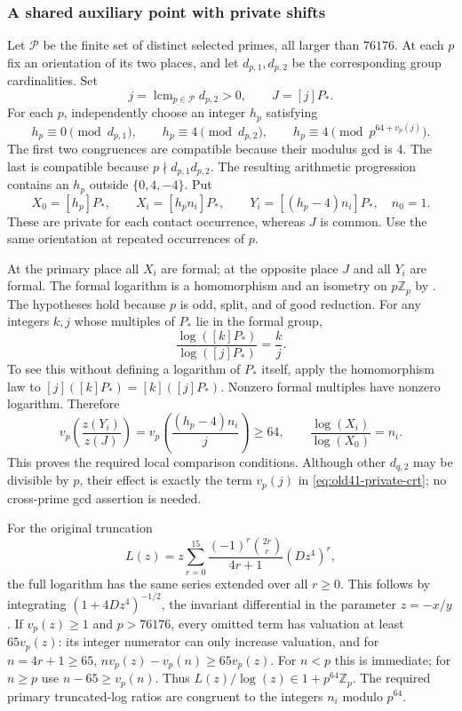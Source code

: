 \subsubsection{A shared auxiliary point with private shifts}\label{subsec:o8-common-J-proof}
Let $\mathcal P$ be the finite set of distinct selected primes, all
larger than $76176$. At each $p$ fix an orientation of its two places,
and let $d_{p,1},d_{p,2}$ be the corresponding group cardinalities.
Set
\[
 j=\operatorname{lcm}_{p\in\mathcal P}d_{p,2}>0,
 \qquad J=[j]P_*.
\]
For each $p$, independently choose an integer $h_p$ satisfying
\begin{equation}\label{eq:old41-private-crt}
 h_p\equiv0\pmod{d_{p,1}},\qquad
 h_p\equiv4\pmod{d_{p,2}},\qquad
 h_p\equiv4\pmod{p^{64+v_p(j)}}.
\end{equation}
The first two congruences are compatible because their modulus gcd
is $4$. The last is compatible because $p\nmid d_{p,1}d_{p,2}$.
The resulting arithmetic progression contains an $h_p$ outside
$\{0,4,-4\}$. Put
\[
 X_0=[h_p]P_*,\qquad X_i=[h_p n_i]P_*,\qquad
 Y_i=[(h_p-4)n_i]P_*,\quad n_0=1.
\]
These are private for each contact occurrence, whereas $J$ is common.
Use the same orientation at repeated occurrences of $p$.

At the primary place all $X_i$ are formal; at the opposite place
$J$ and all $Y_i$ are formal. The formal logarithm is a homomorphism
and an isometry on $p\mathbb Z_p$ by
\cite[IV.6.4 and its proof; VII.2.1--2.2]{silverman}. The hypotheses hold
because $p$ is odd, split, and of good reduction. For any integers
$k,j$ whose multiples of $P_*$ lie in the formal group,
\[
 \frac{\log([k]P_*)}{\log([j]P_*)}=\frac{k}{j}.
\]
To see this without defining a logarithm of $P_*$ itself, apply the
homomorphism law to $[j]([k]P_*)=[k]([j]P_*)$. Nonzero formal
multiples have nonzero logarithm. Therefore
\[
 v_p\left(\frac{z(Y_i)}{z(J)}\right)
 =v_p\left(\frac{(h_p-4)n_i}{j}\right)\ge64,
 \qquad
 \frac{\log(X_i)}{\log(X_0)}=n_i.
\]
This proves the required local comparison conditions. Although other
$d_{q,2}$ may be divisible by $p$, their effect is exactly the term
$v_p(j)$ in \eqref{eq:old41-private-crt}; no cross-prime gcd assertion
is needed.

For the original truncation
\[
 L(z)=z\sum_{r=0}^{15}\frac{(-1)^r\binom{2r}{r}}{4r+1}(Dz^4)^r,
\]
the full logarithm has the same series extended over all $r\ge0$.
This follows by integrating
$(1+4Dz^4)^{-1/2}$, the invariant differential in the parameter
$z=-x/y$. If $v_p(z)\ge1$ and $p>76176$, every omitted term has
valuation at least $65v_p(z)$: its integer numerator can only increase
valuation, and for $n=4r+1\ge65$,
$n v_p(z)-v_p(n)\ge65v_p(z)$.
For $n<p$ this is immediate; for $n\ge p$ use $n-65\ge v_p(n)$.
Thus $L(z)/\log(z)\in1+p^{64}\mathbb Z_p$. The required primary
truncated-log ratios are congruent to the integers $n_i$ modulo $p^{64}$.

